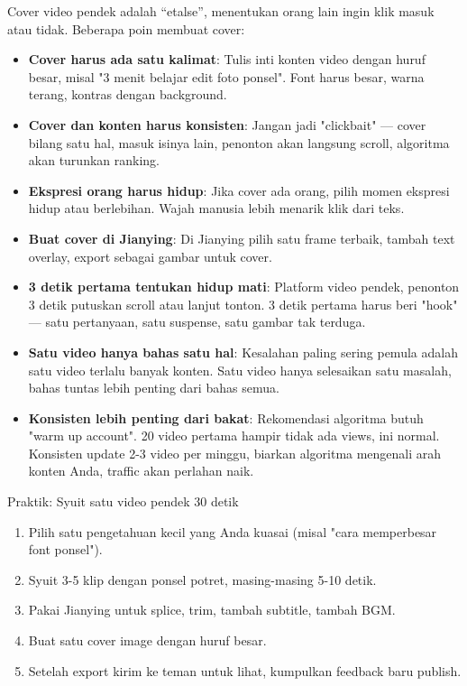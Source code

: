 
Cover video pendek adalah “etalse”, menentukan orang lain ingin klik masuk atau tidak. Beberapa poin membuat cover:

\begin{itemize}
  \item \textbf{Cover harus ada satu kalimat}: Tulis inti konten video dengan huruf besar, misal "3 menit belajar edit foto ponsel". Font harus besar, warna terang, kontras dengan background.
  \item \textbf{Cover dan konten harus konsisten}: Jangan jadi "clickbait" — cover bilang satu hal, masuk isinya lain, penonton akan langsung scroll, algoritma akan turunkan ranking.
  \item \textbf{Ekspresi orang harus hidup}: Jika cover ada orang, pilih momen ekspresi hidup atau berlebihan. Wajah manusia lebih menarik klik dari teks.
  \item \textbf{Buat cover di Jianying}: Di Jianying pilih satu frame terbaik, tambah text overlay, export sebagai gambar untuk cover.
\end{itemize}


\begin{itemize}
  \item \textbf{3 detik pertama tentukan hidup mati}: Platform video pendek, penonton 3 detik putuskan scroll atau lanjut tonton. 3 detik pertama harus beri "hook" — satu pertanyaan, satu suspense, satu gambar tak terduga.
  \item \textbf{Satu video hanya bahas satu hal}: Kesalahan paling sering pemula adalah satu video terlalu banyak konten. Satu video hanya selesaikan satu masalah, bahas tuntas lebih penting dari bahas semua.
  \item \textbf{Konsisten lebih penting dari bakat}: Rekomendasi algoritma butuh "warm up account". 20 video pertama hampir tidak ada views, ini normal. Konsisten update 2-3 video per minggu, biarkan algoritma mengenali arah konten Anda, traffic akan perlahan naik.
\end{itemize}

\begin{tcbpractice}{Praktik: Syuit satu video pendek 30 detik}
\begin{enumerate}
  \item Pilih satu pengetahuan kecil yang Anda kuasai (misal "cara memperbesar font ponsel").
  \item Syuit 3-5 klip dengan ponsel potret, masing-masing 5-10 detik.
  \item Pakai Jianying untuk splice, trim, tambah subtitle, tambah BGM.
  \item Buat satu cover image dengan huruf besar.
  \item Setelah export kirim ke teman untuk lihat, kumpulkan feedback baru publish.
\end{enumerate}

\end{tcbpractice}

